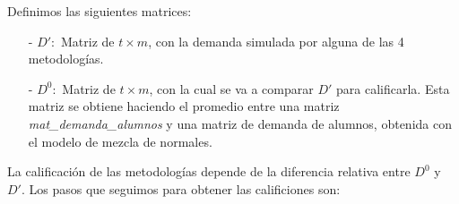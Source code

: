 Definimos las siguientes matrices:

\begin{itemize}
\item[-] $D': $ Matriz de $t \times m$, con la demanda simulada por alguna de las 4 metodologías.
                                                                                                                                                                                                                                                                                                                                                                                                                                                                                  
                                                                                                                                                                                                                                                                                                                                                                                                                                                                                  \item[-] $D^{0}: $ Matriz de $t \times m$, con la cual se va a comparar $D'$ para calificarla. Esta matriz se obtiene haciendo el promedio entre una matriz \textit{mat\_demanda\_alumnos} y una matriz de demanda de alumnos, obtenida con el modelo de mezcla de normales. %
\end{itemize}

La calificación de las metodologías depende de la diferencia relativa entre $D^{0}$ y $D'$. Los pasos que seguimos para obtener las calificiones son:
                                                                                                                                                                                                                                                                                                                                                                                                                                                                                    
